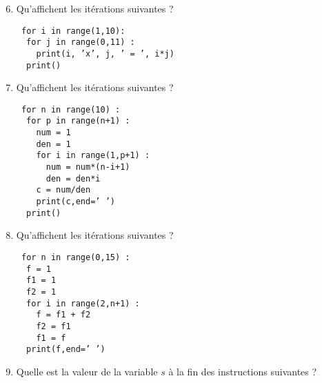 \begin{td}
\begin{minipage}[t]{8cm}
\begin{enumerate}\setcounter{enumi}{5}
\item Qu'affichent les itérations suivantes ?

	{\footnotesize\tt
	for i in range(1,10):\\
	\mbox{}\ \ for j in range(0,11) :\\
	\mbox{}\ \ \ \ print(i, 'x', j, ' = ', i*j)\\
	\mbox{}\ \ print()
	}
\item Qu'affichent les itérations suivantes ?

	{\footnotesize\tt
	for n in range(10) :\\
  	\mbox{}\ \ for p in range(n+1) :\\
    	\mbox{}\ \ \ \ num = 1\\
    	\mbox{}\ \ \ \ den = 1\\
    	\mbox{}\ \ \ \ for i in range(1,p+1) :\\
      	\mbox{}\ \ \ \ \ \ num = num*(n-i+1)\\
      	\mbox{}\ \ \ \ \ \ den = den*i\\
    	\mbox{}\ \ \ \ c = num/den\\
    	\mbox{}\ \ \ \ print(c,end=' ')\\
  	\mbox{}\ \ print()
	}
\end{enumerate}
\end{minipage}
\hfill
\begin{minipage}[t]{8cm}
\begin{enumerate}\setcounter{enumi}{7}
\item Qu'affichent les itérations suivantes ?

	{\footnotesize\tt
	for n in range(0,15) :\\
  	\mbox{}\ \ f = 1\\
  	\mbox{}\ \ f1 = 1\\
  	\mbox{}\ \ f2 = 1\\
  	\mbox{}\ \ for i in range(2,n+1) :\\
    	\mbox{}\ \ \ \ f = f1 + f2\\
    	\mbox{}\ \ \ \ f2 = f1\\
    	\mbox{}\ \ \ \ f1 = f\\
  	\mbox{}\ \ print(f,end=' ')
	}
\item Quelle est la valeur de la variable $s$
	à la fin des instructions suivantes ?


\end{enumerate}
\end{minipage}
\end{td}
